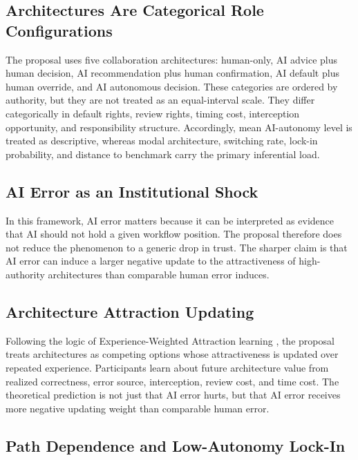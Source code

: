 \documentclass[man,natbib]{apa7}
\begin{document}
\subsection{Architectures Are Categorical Role Configurations}

The proposal uses five collaboration architectures: human-only, AI advice plus human decision, AI recommendation plus human confirmation, AI default plus human override, and AI autonomous decision. These categories are ordered by authority, but they are not treated as an equal-interval scale. They differ categorically in default rights, review rights, timing cost, interception opportunity, and responsibility structure. Accordingly, mean AI-autonomy level is treated as descriptive, whereas modal architecture, switching rate, lock-in probability, and distance to benchmark carry the primary inferential load.

\subsection{AI Error as an Institutional Shock}

In this framework, AI error matters because it can be interpreted as evidence that AI should not hold a given workflow position. The proposal therefore does not reduce the phenomenon to a generic drop in trust. The sharper claim is that AI error can induce a larger negative update to the attractiveness of high-authority architectures than comparable human error induces.

\subsection{Architecture Attraction Updating}

Following the logic of Experience-Weighted Attraction learning \citep{camerer1999ewa}, the proposal treats architectures as competing options whose attractiveness is updated over repeated experience. Participants learn about future architecture value from realized correctness, error source, interception, review cost, and time cost. The theoretical prediction is not just that AI error hurts, but that AI error receives more negative updating weight than comparable human error.

\subsection{Path Dependence and Low-Autonomy Lock-In}
\end{document}
